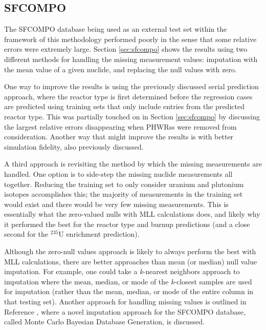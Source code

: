\subsection{SFCOMPO}

The \gls{SFCOMPO} database being used as an external test set within the
framework of this methodology performed poorly in the sense that some relative
errors were extremely large.  Section \ref{sec:sfcompo} shows the results using
two different methods for handling the missing measurement values: imputation
with the mean value of a given nuclide, and replacing the null values with
zero. 

One way to improve the results is using the previously discussed serial
prediction approach, where the reactor type is first determined before the
regression cases are predicted using training sets that only include entries
from the predicted reactor type.  This was partially touched on in Section
\ref{sec:sfcompo} by discussing the largest relative errors disappearing when
\glspl{PHWR}s were removed from consideration.  Another way that might improve
the results is with better simulation fidelity, also previously discussed. 

A third approach is revisiting the method by which the missing measurements are
handled.  One option is to side-step the missing nuclide measurements all
together.  Reducing the training set to only consider uranium and plutonium
isotopes accomplishes this; the majority of measurements in the training set
would exist and there would be very few missing measurements.  This is
essentially what the zero-valued nulls with \gls{MLL} calculations does, and
likely why it performed the best for the reactor type and burnup predictions
(and a close second for the ${}^{235}\text{U}$ enrichment prediction). 

Although the zero-null values approach is likely to always perform the best
with \gls{MLL} calculations, there are better approaches than mean (or median)
null value imputation. For example, one could take a \textit{k}-nearest
neighbors approach to imputation where the mean, median, or mode of the
\textit{k}-closest samples are used for imputation (rather than the mean,
median, or mode of the entire column in that testing set). Another approach for
handling missing values is outlined in Reference \cite{nf_missingdata}, where a
novel imputation approach for the \gls{SFCOMPO} database, called Monte Carlo
Bayesian Database Generation, is discussed.

